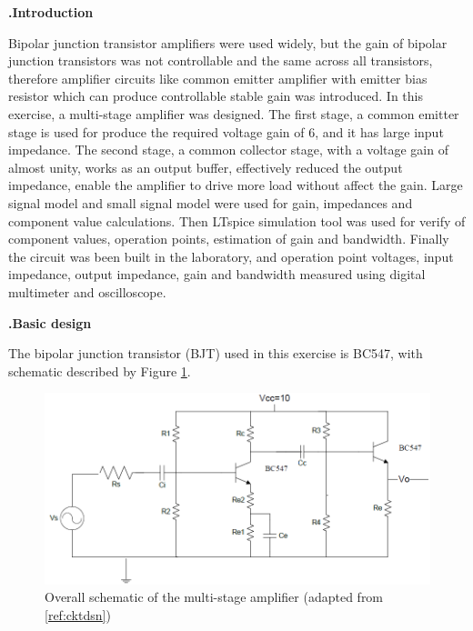 \documentclass[a4paper,notitlepage,10pt]{report}
\newcommand{\tab}{\hspace{0.75cm}}
\newcommand{\fontHeading}{\fontsize{12pt}{13.2pt}\selectfont}
\newcommand{\fontBody}{\fontsize{10pt}{11pt}\selectfont}
\newcounter{sections}
\begin{document}
\columnsep=0.7cm
\begin{multicols}{2}
\parskip=10pt
\fontHeading
{}
\textbf{.\tab Introduction}

\fontBody
Bipolar junction transistor amplifiers were used widely, but the gain of bipolar junction transistors was not controllable and the same across all transistors, therefore amplifier circuits like common emitter amplifier with emitter bias resistor which can produce controllable stable gain was introduced. In this exercise, a multi-stage amplifier was designed. The first stage, a common emitter stage is used for produce the required voltage gain of 6, and it has large input impedance. The second stage, a common collector stage, with a voltage gain of almost unity, works as an output buffer, effectively reduced the output impedance, enable the amplifier to drive more load without affect the gain. Large signal model and small signal model were used for gain, impedances and component value calculations. Then LTspice simulation tool was used for verify of component values, operation points, estimation of gain and bandwidth. Finally the circuit was been built in the laboratory, and operation point voltages, input impedance, output impedance, gain and bandwidth measured using digital multimeter and oscilloscope.
\parskip=10pt


\fontHeading
{}
\textbf{.\tab Basic design}

\fontBody
The bipolar junction transistor (BJT) used in this exercise is BC547, with schematic described by Figure \ref{fig:sch}.
\parskip=0pt
\begin{figure}[H]
	\centering
	\includegraphics[width=\columnwidth]{schematic}
	\caption{Overall schematic of the multi-stage amplifier (adapted from \ref{ref:cktdsn})}
	\label{fig:sch}
\end{figure}


\end{multicols}
\end{document}
